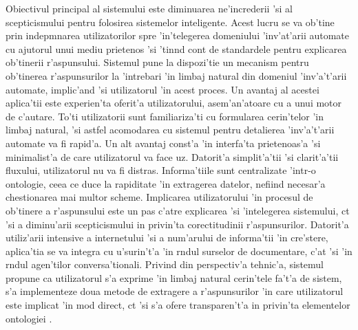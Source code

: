 \documentclass[12pt,a4paper,twoside]{report}
\begin{document}
Obiectivul principal al sistemului este diminuarea ne'increderii 'si al scepticismului pentru folosirea sistemelor inteligente. Acest lucru se va ob'tine prin indepmnarea utilizatorilor spre 'in'telegerea domeniului 'inv'at'arii automate cu ajutorul unui mediu prietenos 'si 'tin\ia nd cont de standardele pentru explicarea ob'tinerii r'aspunsului. Sistemul pune la dispozi'tie un mecanism pentru ob'tinerea r'aspunsurilor la 'intrebari 'in limbaj natural din domeniul 'inv'a't'arii automate, implic'and 'si utilizatorul 'in acest proces. Un avantaj al acestei aplica'tii este experien'ta oferit'a utilizatorului, asem'an'atoare cu a unui motor de c'autare. To'ti utilizatorii sunt familiariza'ti cu formularea cerin'telor 'in limbaj natural, 'si astfel acomodarea cu sistemul pentru detalierea 'inv'a't'arii automate va fi rapid'a. Un alt avantaj const'a 'in interfa'ta prietenoas'a 'si minimalist'a de care utilizatorul va face uz. Datorit'a simplit'a'tii 'si clarit'a'tii fluxului, utilizatorul nu va fi distras. Informa'tiile sunt centralizate 'intr-o ontologie, ceea ce duce la rapiditate 'in extragerea datelor, nefiind necesar'a chestionarea mai multor scheme. Implicarea utilizatorului 'in procesul de ob'tinere a r'aspunsului este un pas c'atre explicarea 'si 'intelegerea sistemului, c\ia t 'si a diminu'arii scepticismului in privin'ta corectitudinii r'aspunsurilor. Datorit'a utiliz'arii intensive a internetului 'si a num'arului de informa'tii 'in cre'stere, aplica'tia se va integra cu u'surin't'a 'in r\ia ndul surselor de documentare, c'at 'si 'in r\ia ndul agen'tilor conversa'tionali. Privind din perspectiv'a tehnic'a, sistemul propune ca utilizatorul s'a exprime 'in limbaj natural cerin'tele fa't'a de sistem, s'a implementeze doua metode de extragere a r'aspunsurilor 'in care utilizatorul este implicat 'in mod direct, c\ia t 'si s'a ofere transparen't'a in privin'ta elementelor ontologiei .
\end{document}
